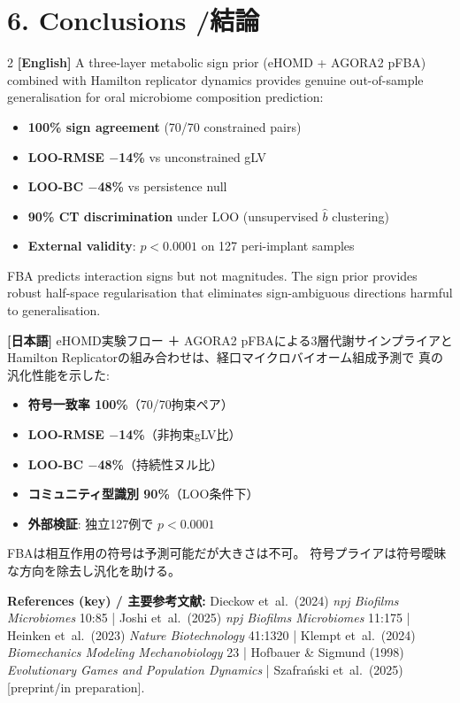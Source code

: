\documentclass[10pt,a4paper]{article}
\begin{document}
\section{6. Conclusions \quad /\quad 結論}

\begin{keybox}
\begin{multicols}{2}
\small
\textbf{[English]}
A three-layer metabolic sign prior (eHOMD + AGORA2 pFBA) combined with
Hamilton replicator dynamics provides genuine out-of-sample generalisation
for oral microbiome composition prediction:
\begin{itemize}[noitemsep]
  \item \textbf{100\% sign agreement} (70/70 constrained pairs)
  \item \textbf{LOO-RMSE $-$14\%} vs unconstrained gLV
  \item \textbf{LOO-BC $-$48\%} vs persistence null
  \item \textbf{90\% CT discrimination} under LOO (unsupervised $\hat b$ clustering)
  \item \textbf{External validity}: $p<0.0001$ on 127 peri-implant samples
\end{itemize}
FBA predicts interaction signs but not magnitudes.
The sign prior provides robust half-space regularisation that
eliminates sign-ambiguous directions harmful to generalisation.

\columnbreak

\textbf{[日本語]}
eHOMD実験フロー ＋ AGORA2 pFBAによる3層代謝サインプライアと
Hamilton Replicatorの組み合わせは、経口マイクロバイオーム組成予測で
真の汎化性能を示した:
\begin{itemize}[noitemsep]
  \item \textbf{符号一致率 100\%}（70/70拘束ペア）
  \item \textbf{LOO-RMSE $-$14\%}（非拘束gLV比）
  \item \textbf{LOO-BC $-$48\%}（持続性ヌル比）
  \item \textbf{コミュニティ型識別 90\%}（LOO条件下）
  \item \textbf{外部検証}: 独立127例で $p<0.0001$
\end{itemize}
FBAは相互作用の符号は予測可能だが大きさは不可。
符号プライアは符号曖昧な方向を除去し汎化を助ける。
\end{multicols}
\end{keybox}

\vspace{0.5em}
\noindent\small
\textbf{References (key) / 主要参考文献:}
Dieckow et~al.\ (2024) \textit{npj Biofilms Microbiomes} 10:85 |
Joshi et~al.\ (2025) \textit{npj Biofilms Microbiomes} 11:175 |
Heinken et~al.\ (2023) \textit{Nature Biotechnology} 41:1320 |
Klempt et~al.\ (2024) \textit{Biomechanics Modeling Mechanobiology} 23 |
Hofbauer \& Sigmund (1998) \textit{Evolutionary Games and Population Dynamics} |
Szafra\'{n}ski et~al.\ (2025) [preprint/in preparation].
\end{document}
